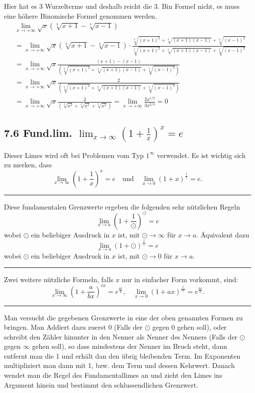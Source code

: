 \documentclass[a4paper,landscape,8pt]{extarticle}
\newcommand{\sep}{\vspace{5pt}\noindent\hrule\vspace{5pt}}
\begin{document}
\begin{multicols*}{4}
Hier hat es 3 Wurzelterme und deshalb reicht die 3. Bin Formel nicht, es muss
eine höhere Binomische Formel genommen werden.
\begin{align*}
&\lim_{x\to+\infty} \sqrt{x}(\sqrt[3]{x+1}-\sqrt[3]{x-1})
\\
&
=\lim_{x\to+\infty} \sqrt{x}(\sqrt[3]{x+1}-\sqrt[3]{x-1})
\cdot\tfrac{\sqrt[3]{(x+1)^2}+\sqrt[3]{(x+1)(x-1)}
+\sqrt[3]{(x-1)^2}}{\sqrt[3]{(x+1)^2}+\sqrt[3]{(x+1)(x-1)}+\sqrt[3]{(x-1)^2}}
\\
&=\lim_{x\to+\infty}
\sqrt{x}\frac{(x+1)-(x-1)}{(\sqrt[3]{(x+1)^2}+\sqrt[3]{(x+1)(x-1)}+\sqrt[3]{(x-1)^2})}
\\
&=\lim_{x\to+\infty}
\sqrt{x}\frac{2}{(\sqrt[3]{(x+1)^2}+\sqrt[3]{(x+1)(x-1)}+\sqrt[3]{(x-1)^2})}
\\
&=\lim_{x\to+\infty}
\sqrt{x}\frac{2}{(\sqrt[3]{x^2}+\sqrt[3]{x^2}+\sqrt[3]{x^2})}
=
\lim_{x\to+\infty}\frac{2x^{1/2}}{3x^{2/3}} =0
\end{align*}

\subsection{7.6 Fund.lim. $\lim_{x\to\infty} \left(1 +
\frac{1}{x}\right)^x=e$}

Dieser Limes wird oft bei Problemen vom Typ $1^{\infty}$ verwendet. Es ist
wichtig sich zu merken, dass
\[
\lim_{x\to\infty} \left(1 + \frac{1}{x}\right)^x = e
\quad \text{und}\quad
\lim_{x\to 0} \left(1 + x\right)^{\frac{1}{x}} = e.
\]

\sep

Diese fundamentalen Grenzwerte ergeben die folgenden sehr nützlichen Regeln
\[
\lim_{x\to a} \left(1 + \frac{1}{\odot}\right)^{\odot} = e
\]
wobei $\odot$ ein beliebiger Ausdruck in $x$ ist, mit $\odot\to\infty$ für
$x\to a$. Äquivalent dazu
\[
\lim_{x\to a} \left(1 + \odot\right)^{\frac{1}{\odot}} = e
\]
wobei $\odot$ ein beliebiger Ausdruck in $x$ ist, mit $\odot\to 0$ für $x\to a$.

\sep

Zwei weitere nützliche Formeln, falls $x$ nur in einfacher Form vorkommt, sind:
\[
\lim_{x\to\infty} \left(1+\frac{a}{bx}\right)^{cx} = e^{\frac{ac}{b}},
\quad
\lim_{x\to 0} \left(1 + ax\right)^{\frac{c}{bx}} = e^{\frac{ac}{b}}.
\]

\sep

\Vorgehen Man versucht die gegebenen Grenzwerte in eine der oben genannten
Formen zu bringen. Man Addiert dazu zuerst 0 (Falls der $\odot$ gegen 0 gehen
soll), oder schreibt den Zähler hinunter in den Nenner als Nenner des Nenners
(Falls der $\odot$ gegen $\infty$ gehen soll), so dass mindestens der Nenner
im Bruch steht, dann entfernt man die 1 und erhält dan den übrig bleibenden Term.
 Im Exponenten multipliziert man dann mit 1, bzw. dem Term und dessen Kehrwert.
  Danach wendet man die Regel des Fundamentallimes an und zieht den Limes
   ins Argument hinein und bestimmt den schlussendlichen Grenzwert.


\end{multicols*}
\end{document}
